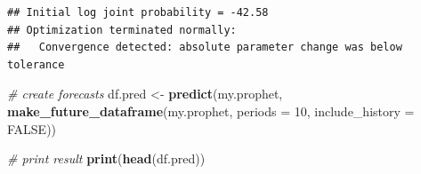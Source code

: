 \documentclass[11pt,]{book}
\newenvironment{Shaded}{\begin{snugshade}}{\end{snugshade}}
\newcommand{\KeywordTok}[1]{\textcolor[rgb]{0.27,0.27,0.27}{\textbf{#1}}}
\newcommand{\DataTypeTok}[1]{\textcolor[rgb]{0.27,0.27,0.27}{#1}}
\newcommand{\DecValTok}[1]{\textcolor[rgb]{0.06,0.06,0.06}{#1}}
\newcommand{\StringTok}[1]{\textcolor[rgb]{0.5,0.5,0.5}{#1}}
\newcommand{\CommentTok}[1]{\textcolor[rgb]{0.56,0.35,0.01}{\textit{#1}}}
\newcommand{\OtherTok}[1]{\textcolor[rgb]{0.56,0.35,0.01}{#1}}
\newcommand{\OperatorTok}[1]{\textcolor[rgb]{0.81,0.36,0.00}{\textbf{#1}}}
\newcommand{\NormalTok}[1]{#1}
\begin{document}
\begin{Shaded}
\end{Shaded}

\begin{verbatim}
## Initial log joint probability = -42.58
## Optimization terminated normally: 
##   Convergence detected: absolute parameter change was below tolerance
\end{verbatim}

\begin{Shaded}
\begin{Highlighting}[]
\CommentTok{# create forecasts }
\NormalTok{df.pred <-}\StringTok{ }\KeywordTok{predict}\NormalTok{(my.prophet,}
                   \KeywordTok{make_future_dataframe}\NormalTok{(my.prophet,}
                                         \DataTypeTok{periods =} \DecValTok{10}\NormalTok{,}
                                         \DataTypeTok{include_history =} \OtherTok{FALSE}\NormalTok{))}

\CommentTok{# print result                                         }
\KeywordTok{print}\NormalTok{(}\KeywordTok{head}\NormalTok{(df.pred))}
\end{Highlighting}
\end{Shaded}
\end{document}
